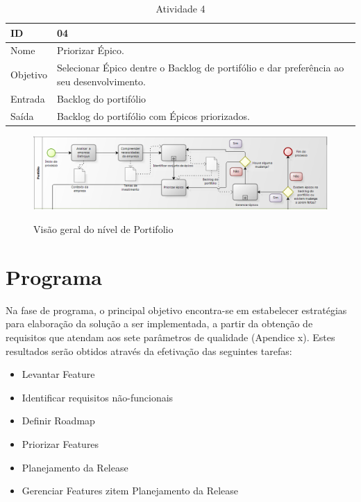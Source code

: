 \begin{table}[\htp]
\centering
\caption{Atividade 4}
\label{my-label}
\begin{tabular}{|l|l|}
\hline
ID       & 04                                                \\ \hline
Nome     & Priorizar Épico. \\ \hline
Objetivo & Selecionar Épico dentre o Backlog de portifólio e dar preferência ao seu desenvolvimento.
 \\ \hline
Entrada  &  Backlog do portifólio \\ \hline
Saída    & Backlog do portifólio com Épicos priorizados. \\ \hline
\end{tabular}
\end{table}


\FloatBarrier
\begin{figure}[!htpd]
		\centering
		\includegraphics[scale=0.5]{figuras/Portifolio}
		\label{img:portifolio}
		\caption{Visão geral do nível de Portifolio}
\end{figure}
\FloatBarrier

\section{Programa}

Na fase de programa, o principal objetivo encontra-se em estabelecer estratégias para elaboração da solução a ser implementada, a partir da obtenção de requisitos que atendam aos sete parâmetros de qualidade (Apendice x). Estes resultados serão obtidos através da efetivação das seguintes tarefas:

\begin{itemize}
\item Levantar Feature
\item Identificar requisitos não-funcionais
\item Definir Roadmap
\item Priorizar Features
\item Planejamento da Release
\item Gerenciar Features
zitem Planejamento da Release
\end{itemize}

